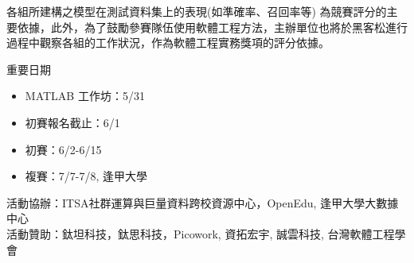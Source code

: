 \documentclass[12pt,oneside,a4paper]{book}
\newenvironment{bottompar}{\par\vspace*{\fill}}{}
\newcommand{\mIndent}{\hspace{.5cm}}
\begin{document}
\mIndent 各組所建構之模型在測試資料集上的表現(如準確率、召回率等) 為競賽評分的主要依據，此外，為了鼓勵參賽隊伍使用軟體工程方法，主辦單位也將於黑客松進行過程中觀察各組的工作狀況，作為軟體工程實務獎項的評分依據。

重要日期

\begin{itemize}
\item MATLAB 工作坊：5/31
\item 初賽報名截止：6/1
\item 初賽：6/2-6/15
\item 複賽：7/7-7/8, 逢甲大學
\end{itemize}

\begin{bottompar}
活動協辦：ITSA社群運算與巨量資料跨校資源中心，OpenEdu, 逢甲大學大數據中心 \\
活動贊助：鈦坦科技，鈦思科技，Picowork, 資拓宏宇, 誠雲科技, 台灣軟體工程學會
\end{bottompar}
\end{document}
